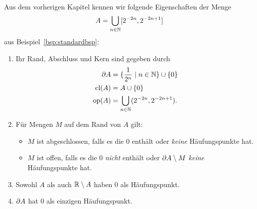     \begin{erin}\ \\
    Aus dem vorherigen Kapitel kennen wir folgende Eigenschaften der Menge %
    \begin{align*}
        A = \bigcup_{n \in \mathbb{N}} [2^{-2n}, 2^{-2n+1}]
    \end{align*}
    aus Beispiel~\ref{bsp:standardbsp}:
        \begin{enumerate}
            \item Ihr Rand, Abschluss und Kern sind gegeben durch
                \begin{align*}
                    \partial A &= \{\frac{1}{2^n} \mid n \in \mathbb{N}\} \cup \{0\}\\
                    \text{cl}(A) &= A \cup \{0\}\\
                    \text{op}(A) &= \bigcup_{n \in \mathbb{N}} (2^{-2n}, 2^{-2n+1}).
                \end{align*}
            \item Für Mengen $M$ auf dem Rand von $A$ gilt:
                \begin{itemize}
                    \item $M$ ist abgeschlossen, falls es die $0$ enthält oder \textit{keine} Häufungspunkte hat.
                    \item $M$ ist offen, falls es die $0$ \textit{nicht} enthält oder $\partial A \setminus M$ \textit{keine} Häufungspunkte hat.
                \end{itemize}
            \item Sowohl $A$ als auch $\mathbb{R} \setminus A$ haben $0$ als Häufungspunkt.
            \item $\partial A$ hat $0$ als einzigen Häufungspunkt.
        \end{enumerate}
    \end{erin}
    
